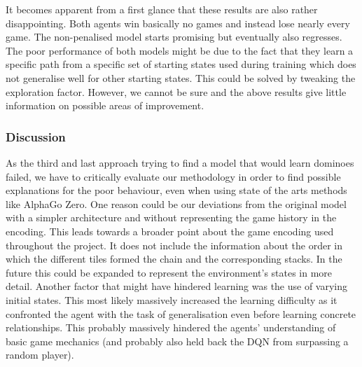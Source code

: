 \documentclass[12pt,a4paper]{article}
\begin{document}
It becomes apparent from a first glance that these results are also rather disappointing. Both agents win basically no games and instead lose nearly every game. The non-penalised model starts promising but eventually also regresses. The poor performance of both models might be due to the fact that they learn a specific path from a specific set of starting states used during training which does not generalise well for other starting states. This could be solved by tweaking the exploration factor. However, we cannot be sure and the above results give little information on possible areas of improvement.

\subsubsection{Discussion}
As the third and last approach trying to find a model that would learn dominoes failed, we have to critically evaluate our methodology in order to find possible explanations for the poor behaviour, even when using state of the arts methods like AlphaGo Zero. One reason could be our deviations from the original model with a simpler architecture and without representing the game history in the encoding. This leads towards a broader point about the game encoding used throughout the project. It does not include the information about the order in which the different tiles formed the chain and the corresponding stacks. In the future this could be expanded to represent the environment’s states in more detail.
Another factor that might have hindered learning was the use of varying initial states. This most likely massively increased the learning difficulty as it confronted the agent with the task of generalisation even before learning concrete relationships. This probably massively hindered the agents' understanding of basic game mechanics (and probably also held back the DQN from surpassing a random player). 
\end{document}
